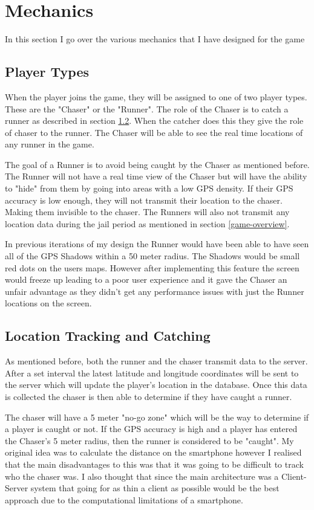 \documentclass{l4proj}
\begin{document}
\section{Mechanics}
In this section I go over the various mechanics that I have designed for the game

\subsection{Player Types}
When the player joins the game, they will be assigned to one of two player types. These are the "Chaser" or the "Runner".
The role of the Chaser is to catch a runner as described in section \ref{catching}. When the catcher does this they give the role of chaser to the runner. The Chaser
will be able to see the real time locations of any runner in the game.

The goal of a Runner is to avoid being caught by the Chaser as mentioned before. The Runner will not have a real time
view of the Chaser but will have the ability to "hide" from them by going into areas with a low GPS density. If their
GPS accuracy is low enough, they will not transmit their location to the chaser. Making them invisible to the chaser.
The Runners will also not transmit any location data during the jail period as mentioned in section \ref{game-overview}.

In previous iterations of my design the Runner would have been able to have seen all of the GPS Shadows within a 50
meter radius. The Shadows would be small red dots on the users maps. However after implementing this feature the screen
would freeze up leading to a poor user experience and it gave the Chaser an unfair advantage as they didn't get any
performance issues with just the Runner locations on the screen.

\subsection{Location Tracking and Catching}
\label{catching}
As mentioned before, both the runner and the chaser transmit data to the server. After a set interval
the latest latitude and longitude coordinates will be sent to the server which will update the player's location
in the database. Once this data is collected the chaser is then able to determine if they have caught a runner.

The chaser will have a 5 meter "no-go zone" which will be the way to determine if a player is caught or not. If
the GPS accuracy is high and a player has entered the Chaser's 5 meter radius, then the runner is considered to be 
"caught". My original idea was to calculate the distance on the smartphone however I realised that the main disadvantages
to this was that it was going to be difficult to track who the chaser was. I also thought that since the main architecture
was a Client-Server system that going for as thin a client as possible would be the best approach due to the computational
limitations of a smartphone.
\end{document}
